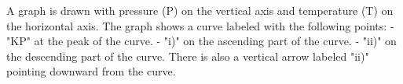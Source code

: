 A graph is drawn with pressure (P) on the vertical axis and temperature (T) on the horizontal axis. The graph shows a curve labeled with the following points:  
- "KP" at the peak of the curve.  
- "i)" on the ascending part of the curve.  
- "ii)" on the descending part of the curve.  
There is also a vertical arrow labeled "ii)" pointing downward from the curve.